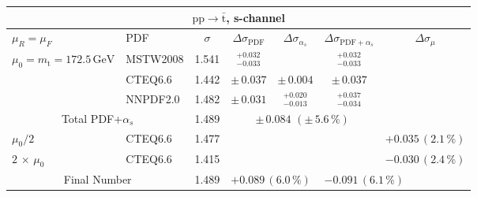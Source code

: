 \begin{table}[htb]
  \begin{center}
    \begin{tabular}{|l|l|c|c|c|c|c|}
      \hline

      \multicolumn{7}{|c|}{$\mathrm{pp}\to\bar{\mathrm{t}}$, s-channel} \\ \hline
      $\mu_R=\mu_F$ & PDF & $\sigma$ & $\Delta\sigma_{\mathrm{PDF}}$ & $\Delta\sigma_{\alpha_s}$ & $\Delta\sigma_{\mathrm{PDF}+\alpha_s}$ & $\Delta\sigma_{\mu}$ \\ \hline\hline

      $\mu_0=m_\mathrm{t}=172.5\,\mathrm{GeV}$ & MSTW2008 & 1.541 & $^{+0.032}_{-0.033}$ &     &  $^{+0.032}_{-0.033}$    &     \\
                                                & CTEQ6.6  & 1.442 & $\pm\,0.037$ &  $\pm\,0.004$  &  $\pm\,0.037$       &     \\
                                                & NNPDF2.0 & 1.482 & $\pm\,0.031$ &  $^{+0.020}_{-0.013}$  & $^{+0.037}_{-0.034}$     &     \\ \hline\hline
      \multicolumn{2}{|c|}{Total PDF+$\alpha_s$}      &  1.489    & \multicolumn{3}{c|}{$\pm\,0.084\,\,(\pm\,5.6\,\%)$} & \\ \hline\hline
      $\mu_0/2$                                 & CTEQ6.6 & 1.477 & \multicolumn{3}{c|}{} & $+0.035\,(2.1\,\%)$ \\ 
      $2\,\times\,\mu_0$                        & CTEQ6.6 & 1.415 & \multicolumn{3}{c|}{} & $-0.030\,(2.4\,\%)$ \\  \hline\hline
      \multicolumn{2}{|c|}{Final Number} & 1.489  & \multicolumn{2}{l}{$+0.089\,(6.0\,\%)$} & \multicolumn{2}{l|}{$-0.091\,(6.1\,\%)$} \\



\hline 
\end{tabular}
\end{center}
\end{table} 


